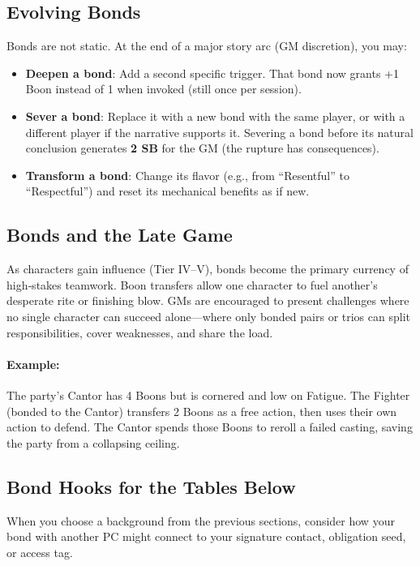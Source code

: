 \subsection{Evolving Bonds}

Bonds are not static. At the end of a major story arc (GM discretion), you may:
\begin{itemize}
\item \textbf{Deepen a bond}: Add a second specific trigger. That bond now grants +1 Boon instead of 1 when invoked (still once per session).
\item \textbf{Sever a bond}: Replace it with a new bond with the same player, or with a different player if the narrative supports it. Severing a bond before its natural conclusion generates \textbf{2 SB} for the GM (the rupture has consequences).
\item \textbf{Transform a bond}: Change its flavor (e.g., from “Resentful” to “Respectful”) and reset its mechanical benefits as if new.
\end{itemize}

\subsection{Bonds and the Late Game}

As characters gain influence (Tier IV–V), bonds become the primary currency of high‑stakes teamwork. Boon transfers allow one character to fuel another’s desperate rite or finishing blow. GMs are encouraged to present challenges where no single character can succeed alone—where only bonded pairs or trios can split responsibilities, cover weaknesses, and share the load.

\paragraph{Example:} The party’s Cantor has 4 Boons but is cornered and low on Fatigue. The Fighter (bonded to the Cantor) transfers 2 Boons as a free action, then uses their own action to defend. The Cantor spends those Boons to reroll a failed casting, saving the party from a collapsing ceiling.

\subsection{Bond Hooks for the Tables Below}

When you choose a background from the previous sections, consider how your bond with another PC might connect to your signature contact, obligation seed, or access tag.

